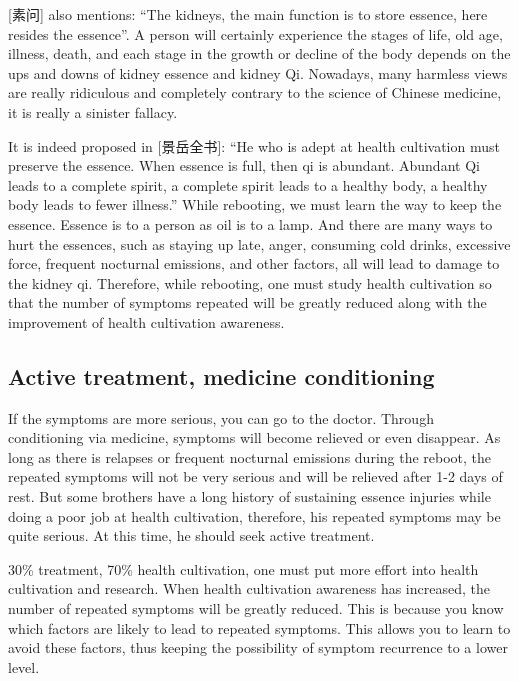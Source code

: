 \documentclass[
]{book}
\begin{document}
{[}素问{]} also mentions: ``The kidneys, the main function is to store essence, here resides the essence''. A person will certainly experience the stages of life, old age, illness, death, and each stage in the growth or decline of the body depends on the ups and downs of kidney essence and kidney Qi. Nowadays, many harmless views are really ridiculous and completely contrary to the science of Chinese medicine, it is really a sinister fallacy.

It is indeed proposed in {[}景岳全书{]}: ``He who is adept at health cultivation must preserve the essence. When essence is full, then qi is abundant. Abundant Qi leads to a complete spirit, a complete spirit leads to a healthy body, a healthy body leads to fewer illness.'' While rebooting, we must learn the way to keep the essence. Essence is to a person as oil is to a lamp. And there are many ways to hurt the essences, such as staying up late, anger, consuming cold drinks, excessive force, frequent nocturnal emissions, and other factors, all will lead to damage to the kidney qi. Therefore, while rebooting, one must study health cultivation so that the number of symptoms repeated will be greatly reduced along with the improvement of health cultivation awareness.

\hypertarget{active-treatment-medicine-conditioning}{%
\subsection{Active treatment, medicine conditioning}\label{active-treatment-medicine-conditioning}}

If the symptoms are more serious, you can go to the doctor. Through conditioning via medicine, symptoms will become relieved or even disappear. As long as there is relapses or frequent nocturnal emissions during the reboot, the repeated symptoms will not be very serious and will be relieved after 1-2 days of rest. But some brothers have a long history of sustaining essence injuries while doing a poor job at health cultivation, therefore, his repeated symptoms may be quite serious. At this time, he should seek active treatment.

30\% treatment, 70\% health cultivation, one must put more effort into health cultivation and research. When health cultivation awareness has increased, the number of repeated symptoms will be greatly reduced. This is because you know which factors are likely to lead to repeated symptoms. This allows you to learn to avoid these factors, thus keeping the possibility of symptom recurrence to a lower level.
\end{document}

